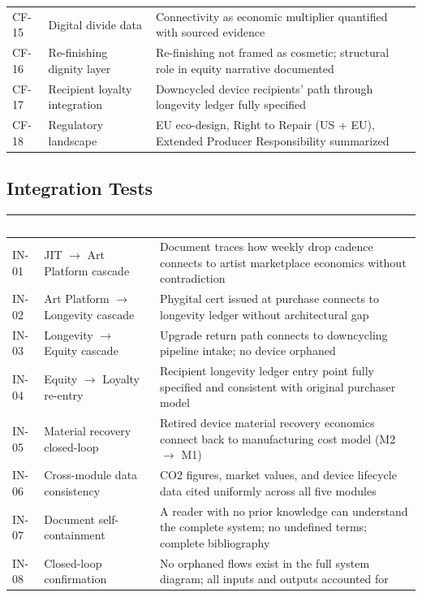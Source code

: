 \documentclass[11pt,letterpaper]{article}
\newcommand{\tableheader}[1]{\textbf{\sffamily\textcolor{white}{#1}}}
\begin{document}
\begin{center}
\begin{tabularx}{\textwidth}{C{1.5cm}XL{4.5cm}}
CF-15 & Digital divide data & Connectivity as economic multiplier quantified with sourced evidence \\
CF-16 & Re-finishing dignity layer & Re-finishing not framed as cosmetic; structural role in equity narrative documented \\
CF-17 & Recipient loyalty integration & Downcycled device recipients' path through longevity ledger fully specified \\
CF-18 & Regulatory landscape & EU eco-design, Right to Repair (US + EU), Extended Producer Responsibility summarized \\
\bottomrule
\end{tabularx}
\end{center}

\subsection{Integration Tests}

\begin{center}
\begin{tabularx}{\textwidth}{C{1.5cm}XL{4.5cm}}
\toprule
{}
\tableheader{ID} & \tableheader{Verifies} & \tableheader{Expected} \\
\midrule
IN-01 & JIT $\to$ Art Platform cascade & Document traces how weekly drop cadence connects to artist marketplace economics without contradiction \\
IN-02 & Art Platform $\to$ Longevity cascade & Phygital cert issued at purchase connects to longevity ledger without architectural gap \\
IN-03 & Longevity $\to$ Equity cascade & Upgrade return path connects to downcycling pipeline intake; no device orphaned \\
IN-04 & Equity $\to$ Loyalty re-entry & Recipient longevity ledger entry point fully specified and consistent with original purchaser model \\
IN-05 & Material recovery closed-loop & Retired device material recovery economics connect back to manufacturing cost model (M2 $\to$ M1) \\
IN-06 & Cross-module data consistency & CO2 figures, market values, and device lifecycle data cited uniformly across all five modules \\
IN-07 & Document self-containment & A reader with no prior knowledge can understand the complete system; no undefined terms; complete bibliography \\
IN-08 & Closed-loop confirmation & No orphaned flows exist in the full system diagram; all inputs and outputs accounted for \\
\bottomrule
\end{tabularx}
\end{center}
\end{document}
